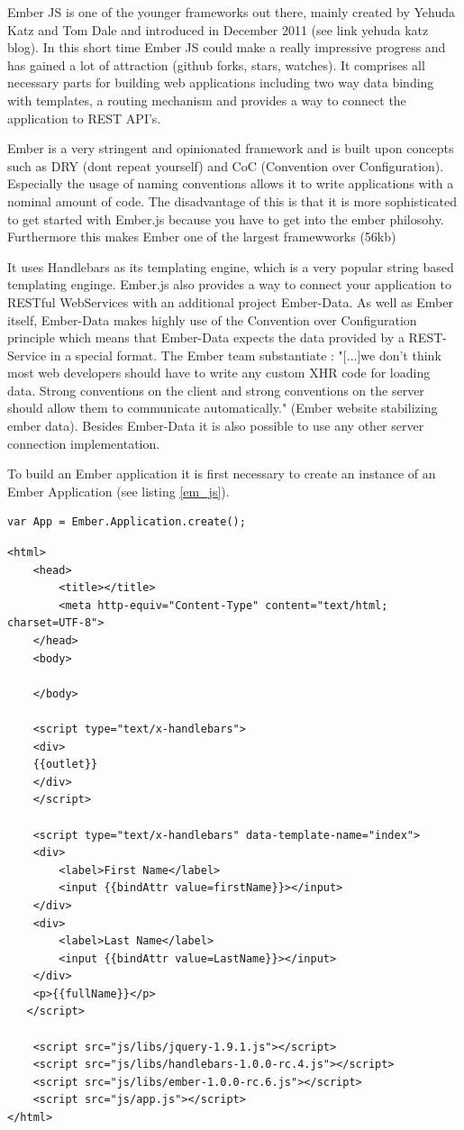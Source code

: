 Ember JS is one of the younger frameworks out there, mainly created by Yehuda Katz and Tom Dale and introduced in December 2011 (see link yehuda katz blog). In this short time Ember JS could make a really impressive progress and has gained a lot of attraction (github forks, stars, watches). It comprises all necessary parts for building web applications including two way data binding with templates, a routing mechanism and provides a way to connect the application to REST API's. 

Ember is a very stringent and opinionated framework and is built upon concepts such as DRY (dont repeat yourself) and CoC (Convention over Configuration). Especially the usage of naming conventions allows it to write applications with a nominal amount of code. The disadvantage of this is that it is more sophisticated to get started with Ember.js because you have to get into the ember philosohy. %
Furthermore this makes Ember one of the largest framewworks (56kb)


It uses Handlebars as its templating engine, which is a very popular string based templating enginge. Ember.js also provides a way to connect your application to RESTful WebServices with an additional project Ember-Data. As well as Ember itself, Ember-Data makes highly use of the Convention over Configuration principle which means that Ember-Data expects the data provided by a REST-Service in a special format. The Ember team substantiate : "[...]we don't think most web developers should have to write any custom XHR code for loading data. Strong conventions on the client and strong conventions on the server should allow them to communicate automatically." (Ember website stabilizing ember data). Besides Ember-Data it is also possible to use any other server connection implementation.         


To build an Ember application it is first necessary to create an instance of an Ember Application (see listing \ref{em_js}).
\begin{lstlisting}[label=em_js, caption=app.js]
var App = Ember.Application.create();
\end{lstlisting}

\begin{lstlisting}[label=em_html,caption=index.html]
<html>
    <head>
        <title></title>
        <meta http-equiv="Content-Type" content="text/html; charset=UTF-8">
    </head>
    <body>

    </body>
    
    <script type="text/x-handlebars">
	<div>
	{{outlet}}
	</div>
    </script>

    <script type="text/x-handlebars" data-template-name="index">
	<div>
		<label>First Name</label> 
		<input {{bindAttr value=firstName}}></input>
	</div>
	<div>
		<label>Last Name</label> 
		<input {{bindAttr value=LastName}}></input>
	</div>
	<p>{{fullName}}</p>
   </script>

    <script src="js/libs/jquery-1.9.1.js"></script>
    <script src="js/libs/handlebars-1.0.0-rc.4.js"></script>
    <script src="js/libs/ember-1.0.0-rc.6.js"></script>
    <script src="js/app.js"></script>
</html>
\end{lstlisting}

